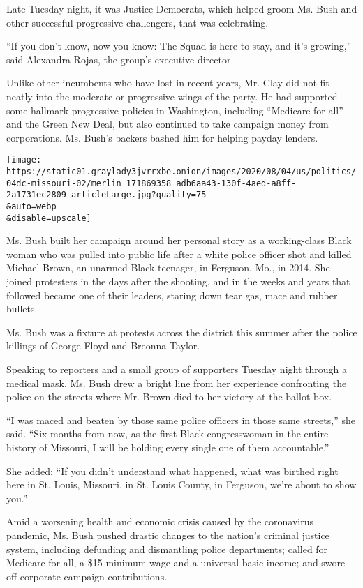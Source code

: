 Late Tuesday night, it was Justice Democrats, which helped groom Ms.
Bush and other successful progressive challengers, that was celebrating.

``If you don't know, now you know: The Squad is here to stay, and it's
growing,'' said Alexandra Rojas, the group's executive director.

Unlike other incumbents who have lost in recent years, Mr. Clay did not
fit neatly into the moderate or progressive wings of the party. He had
supported some hallmark progressive policies in Washington, including
``Medicare for all'' and the Green New Deal, but also continued to take
campaign money from corporations. Ms. Bush's backers bashed him for
helping payday lenders.

\texttt{[image: https://static01.graylady3jvrrxbe.onion/images/2020/08/04/us/politics/04dc-missouri-02/merlin\_171869358\_adb6aa43-130f-4aed-a8ff-2a1731ec2809-articleLarge.jpg?quality=75\\\&auto=webp\\\&disable=upscale]}

Ms. Bush built her campaign around her personal story as a working-class
Black woman who was pulled into public life after a white police officer
shot and killed Michael Brown, an unarmed Black teenager, in Ferguson,
Mo., in 2014. She joined protesters in the days after the shooting, and
in the weeks and years that followed became one of their leaders,
staring down tear gas, mace and rubber bullets.

Ms. Bush was a fixture at protests across the district this summer after
the police killings of George Floyd and Breonna Taylor.

Speaking to reporters and a small group of supporters Tuesday night
through a medical mask, Ms. Bush drew a bright line from her experience
confronting the police on the streets where Mr. Brown died to her
victory at the ballot box.

``I was maced and beaten by those same police officers in those same
streets,'' she said. ``Six months from now, as the first Black
congresswoman in the entire history of Missouri, I will be holding every
single one of them accountable.''

She added: ``If you didn't understand what happened, what was birthed
right here in St. Louis, Missouri, in St. Louis County, in Ferguson,
we're about to show you.''

Amid a worsening health and economic crisis caused by the coronavirus
pandemic, Ms. Bush pushed drastic changes to the nation's criminal
justice system, including defunding and dismantling police departments;
called for Medicare for all, a \$15 minimum wage and a universal basic
income; and swore off corporate campaign contributions.

